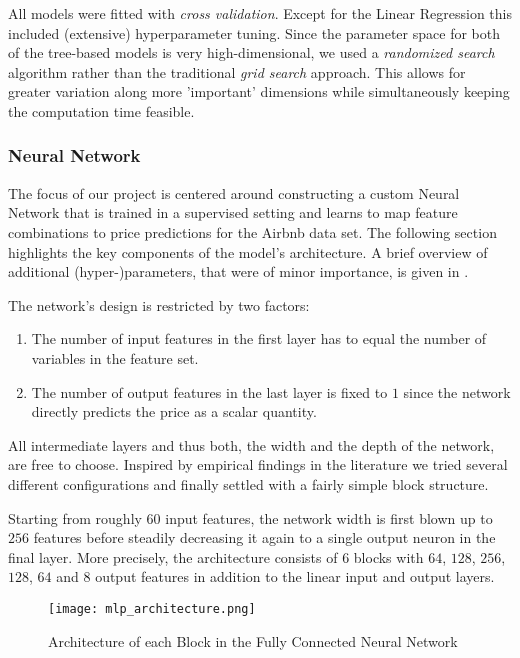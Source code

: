 All models were fitted with \emph{cross validation}.
Except for the Linear Regression this included (extensive) hyperparameter tuning.
Since the parameter space for both of the tree-based models is very high-dimensional, we used a \emph{randomized search} algorithm \citep{bergstra2012} rather than the traditional \emph{grid search} approach.
This allows for greater variation along more 'important' dimensions while simultaneously keeping the computation time feasible.


\subsubsection{Neural Network} \label{neural-network}

The focus of our project is centered around constructing a custom Neural Network that is trained in a supervised setting and learns to map feature combinations to price predictions for the Airbnb data set.
The following section highlights the key components of the model's architecture.
A brief overview of additional (hyper-)parameters, that were of minor importance, is given in .

The network's design is restricted by two factors:
\begin{enumerate}
      \item The number of input features in the first layer has to equal the number of variables in the feature set.
      \item The number of output features in the last layer is fixed to $1$ since the network directly predicts the price as a scalar quantity.
\end{enumerate}
All intermediate layers and thus both, the width and the depth of the network, are free to choose.
Inspired by empirical findings in the literature we tried several different configurations and finally settled with a fairly simple block structure.

Starting from roughly $60$ input features, the network width is first blown up to $256$ features before steadily decreasing it again to a single output neuron in the final layer.
More precisely, the architecture consists of $6$ blocks with $64$, $128$, $256$, $128$, $64$ and $8$ output features in addition to the linear input and output layers.

\begin{figure}[t]
      \centering
      \texttt{[image: mlp\_architecture.png]}
      \caption{Architecture of each Block in the Fully Connected Neural Network}
      \label{fig:linear-block}
\end{figure}

